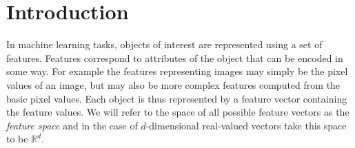 









\chapter{Introduction}

In machine learning tasks, objects of interest are represented using a set of features. Features correspond to attributes of the object that can be encoded in some way. For example the features representing images may simply be the pixel values of an image, but may also be more complex features computed from the basic pixel values. Each object is thus represented by a feature vector containing the feature values. We will refer to the space of all possible feature vectors as the \emph{feature space} and in the case of $d$-dimensional real-valued vectors take this space to be $\mathbb{R}^d$. 


